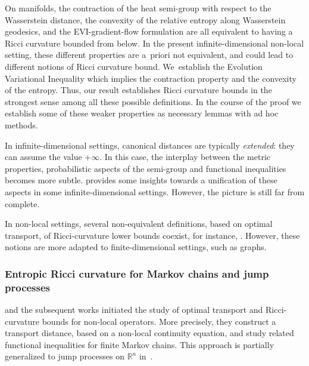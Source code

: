 \documentclass[10pt]{amsart}
\theoremstyle{definition}
\theoremstyle{remark}
\let\Subsubsection\subsubsection
\begin{document}
On manifolds, the contraction of the heat semi-group with respect to the Wasserstein distance, the convexity of the relative entropy along Wasserstein geodesics, and the EVI-gradient-flow formulation are all equivalent to having a Ricci curvature bounded from below.
In the present infinite-dimensional non-local setting, these different properties are a~priori not equivalent, and could lead to different notions of Ricci curvature bound. We~establish the Evolution Variational Inequality which implies the contraction property and the convexity of the entropy.
Thus, our result establishes Ricci curvature bounds in the strongest sense among all these possible definitions.
In the course of the proof we establish some of these weaker properties as necessary lemmas with ad hoc methods.

In infinite-dimensional settings, canonical distances are typically \emph{extended}: they can assume the value $+\infty$.
In this case, the interplay between the metric properties, probabilistic aspects of the semi-group and functional inequalities becomes more subtle.
\cite{AmbrosioErbarSavare} provides some insights towards a unification of these aspects in some infinite-dimensional settings.
However, the picture is still far from complete.

In non-local settings, several non-equivalent definitions, based on optimal transport, of Ricci-curvature lower bounds coexist, for instance, \cite{Ollivier,GRSTCurvature,Samson,Maas}.
However, these notions are more adapted to finite-dimensional settings, such as graphs.

\Subsubsection{Entropic Ricci curvature for Markov chains and jump processes}
\cite{Maas,Mielke} and the subsequent works \cite{ErbarMaas,FathiMaas} initiated the study of opti\-mal transport and Ricci-curvature bounds for non-local operators.
More precisely, they construct a transport distance, based on a non-local continuity equation, and study related functional inequalities for finite Markov chains.
This approach is partially generalized to jump processes on $\mathbb{R}^{n}$ in~\cite{Erbar}.
\end{document}

